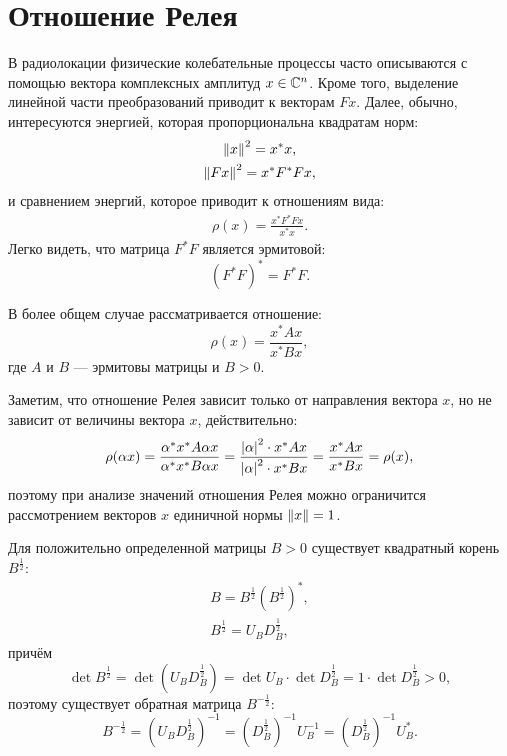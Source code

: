 \section{Отношение Релея}

В радиолокации физические колебательные процессы часто описываются с помощью вектора комплексных амплитуд $x \in \mathbb{C}^{n}$. Кроме того, выделение линейной части
преобразований приводит к векторам $Fx$. Далее, обычно, интересуются энергией, которая пропорциональна квадратам норм:
\begin{gather*}
    \left \| x \right \|^2 = x^* x , \\
    \left \| F x \right \|^2 = x^* F^* F x ,
\end{gather*}
и сравнением энергий, которое приводит к отношениям вида:
\begin{gather*}
    \rho(x) = \frac{x^* F^* F x}{x^* x}.
\end{gather*}
Легко видеть, что матрица $F^* F$ является эрмитовой:
\[
    ( F^* F )^* = F^* F .
\]

В более общем случае рассматривается отношение:
\[
    \rho(x) = \frac{x^* A x}{x^* B x},
\]
где $A$ и $B$ --- эрмитовы матрицы и $B > 0$.

Заметим, что отношение Релея зависит только от направления вектора $x$, но не зависит от величины вектора $x$, действительно:
\begin{equation}
    \label{rayleight:ration:homogenity}
    \rho(\alpha x)
    = \frac{\alpha^* x^* A \alpha x}{ \alpha^* x^* B \alpha x}
    = \frac{\left | \alpha \right |^2 \cdot x^* A x}{ \left | \alpha \right |^2 \cdot x^* B x}
    = \frac{x^* A x}{x^* B x}
    = \rho(x) ,
\end{equation}
поэтому при анализе значений отношения Релея можно ограничится рассмотрением векторов $x$ единичной нормы $\left \| x \right \| = 1$.

Для положительно определенной матрицы $B > 0$ существует квадратный корень $B^\frac{1}{2}$:
\begin{gather*}
    B = B^\frac{1}{2} ( B^\frac{1}{2} )^* , \\
    B^\frac{1}{2} = U_B D_B^\frac{1}{2} ,
\end{gather*}
причём
\[
    \det B^\frac{1}{2}
    = \det ( U_B D_B^\frac{1}{2} )
    = \det U_B \cdot \det D_B^\frac{1}{2}
    = 1 \cdot \det D_B^\frac{1}{2}
    > 0 ,
\]
поэтому существует обратная матрица $B^{-\frac{1}{2}}$:
\[
    B^{-\frac{1}{2}}
    = \left ( U_B D_B^\frac{1}{2} \right )^{-1}
    = \left ( D_B^\frac{1}{2} \right )^{-1} U_B^{-1}
    = \left ( D_B^\frac{1}{2} \right )^{-1} U_B^* .
\]

